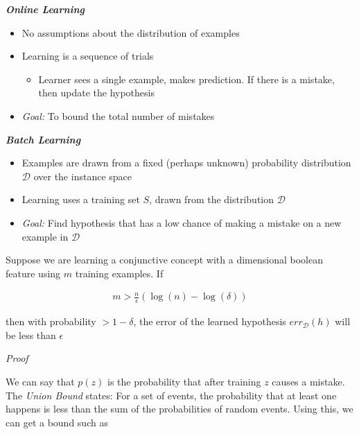 \documentclass{article}
\begin{document}
\begin{center}
\noindent\parbox[t]{.4\textwidth}{\raggedright%
\textbf{\textit{Online Learning}}
\begin{itemize}[topsep=0pt,itemsep=-2pt,leftmargin=13pt]
\item No assumptions about the distribution of examples
\item Learning is a sequence of trials
\begin{itemize}[topsep=0pt,itemsep=-2pt,leftmargin=13pt]
\item Learner sees a single example, makes prediction. If there is a mistake, then update the hypothesis
\end{itemize}
\item {\em Goal:} To bound the total number of mistakes 
\end{itemize}
}%
\parbox[t]{.4\textwidth}{\raggedright%
\textbf{\textit{Batch Learning}}
\begin{itemize}[topsep=0pt,itemsep=-2pt,leftmargin=13pt]
\item Examples are drawn from a fixed (perhaps unknown) probability distribution $\mathcal{D}$ over the instance space
\item Learning uses a training set $S$, drawn from the distribution $\mathcal{D}$
\item {\em Goal:} Find hypothesis that has a low chance of making a mistake on a new example in $\mathcal{D}$
\end{itemize}
}
\end{center}

Suppose we are learning a conjunctive concept with a dimensional boolean feature using $m$ training examples. If 

\begin{align}
m > \frac{n}{\epsilon}\left(\log(n)-\log(\delta)\right)
\end{align}

then with probability $> 1-\delta$, the error of the learned hypothesis $err_{\mathcal{D}}(h)$ will be less than $\epsilon$

{\em Proof}

We can say that $p(z)$ is the probability that after training $z$ causes a mistake. The {\em Union Bound} states: For a set of events, the probability that at least one happens is less than the sum of the probabilities of random events. Using this, we can get a bound such as
\end{document}
